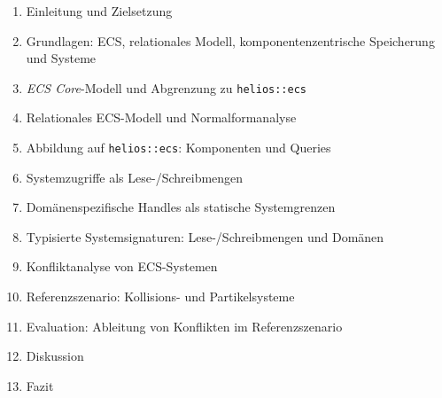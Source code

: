 \begin{enumerate}
    \item Einleitung und Zielsetzung
    \item Grundlagen: ECS, relationales Modell, komponentenzentrische Speicherung und Systeme
    \item \textit{ECS Core}-Modell und Abgrenzung zu \texttt{helios::ecs}
    \item Relationales ECS-Modell und Normalformanalyse
    \item Abbildung auf \texttt{helios::ecs}: Komponenten und Queries
    \item Systemzugriffe als Lese-/Schreibmengen
    \item Domänenspezifische Handles als statische Systemgrenzen
    \item Typisierte Systemsignaturen: Lese-/Schreibmengen und Domänen
    \item Konfliktanalyse von ECS-Systemen
    \item Referenzszenario: Kollisions- und Partikelsysteme
    \item Evaluation: Ableitung von Konflikten im Referenzszenario
    \item Diskussion
    \item Fazit
\end{enumerate}